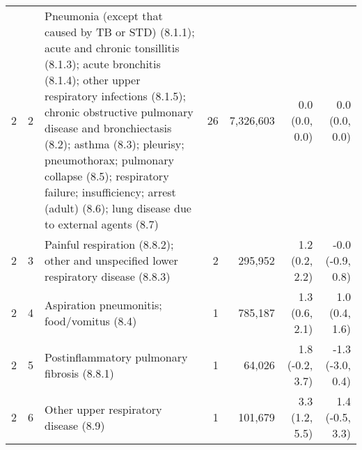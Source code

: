 \begin{tabular}{llp{6.5cm}rrrr}
   2 &  2 & Pneumonia (except that caused by TB or STD) (8.1.1); acute and chronic tonsillitis (8.1.3); acute bronchitis (8.1.4); other upper respiratory infections (8.1.5); chronic obstructive pulmonary disease and bronchiectasis (8.2); asthma (8.3); pleurisy; pneumothorax; pulmonary collapse (8.5); respiratory failure; insufficiency; arrest (adult) (8.6); lung disease due to external agents (8.7) & 26 & 7,326,603 & 0.0 (0.0, 0.0) & 0.0 (0.0, 0.0) \\ 
   2 &  3 & Painful respiration (8.8.2); other and unspecified lower respiratory disease (8.8.3) &  2 & 295,952 & 1.2 (0.2, 2.2) & -0.0 (-0.9, 0.8) \\ 
   2 &  4 & Aspiration pneumonitis; food/vomitus (8.4) &  1 & 785,187 & 1.3 (0.6, 2.1) & 1.0 (0.4, 1.6) \\ 
   2 &  5 & Postinflammatory pulmonary fibrosis (8.8.1) &  1 & 64,026 & 1.8 (-0.2, 3.7) & -1.3 (-3.0, 0.4) \\ 
   2 &  6 & Other upper respiratory disease (8.9) &  1 & 101,679 & 3.3 (1.2, 5.5) & 1.4 (-0.5, 3.3) \\ 
   \hline
\end{tabular}

